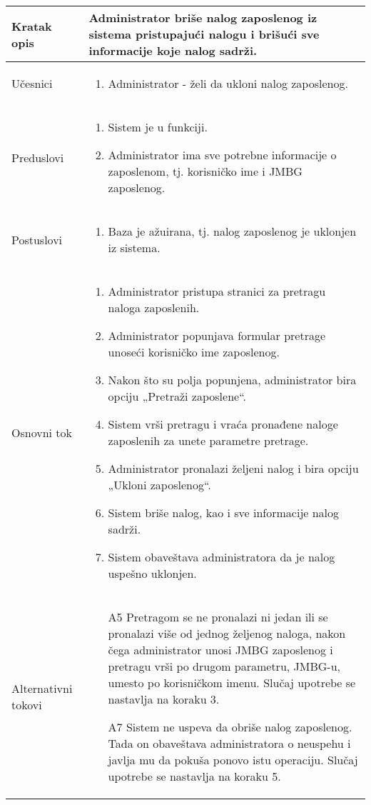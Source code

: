 \documentclass[../main.tex]{subfiles}
\begin{document}
\begin{longtable}{| p{} | p{} |} 

\hline
    Kratak opis &  Administrator briše nalog zaposlenog iz sistema pristupajući nalogu i brišući sve informacije koje nalog sadrži.\\ 
\hline    
    Učesnici & 
    	\begin{enumerate}
        \item Administrator - želi da ukloni nalog zaposlenog.
     \end{enumerate}\\
\hline
   Preduslovi & \begin{enumerate}
       \item Sistem je u funkciji.
       \item Administrator ima sve potrebne informacije o zaposlenom, tj. korisničko ime i JMBG zaposlenog.
   \end{enumerate}\\
\hline  
    Postuslovi & \begin{enumerate}
        \item Baza je ažuirana, tj. nalog zaposlenog je uklonjen iz sistema.
    \end{enumerate}\\
\hline
    Osnovni tok & \begin{enumerate}
        \item Administrator pristupa stranici za pretragu naloga zaposlenih.
        \item Administrator popunjava formular pretrage unoseći korisničko ime zaposlenog.
        \item Nakon što su polja popunjena, administrator bira opciju „Pretraži zaposlene“.
        \item Sistem vrši pretragu i vraća pronađene naloge zaposlenih za unete parametre pretrage.
        \item Administrator pronalazi željeni nalog i bira opciju „Ukloni zaposlenog“.
        \item Sistem briše nalog, kao i sve informacije nalog sadrži.
        \item Sistem obaveštava administratora da je nalog uspešno uklonjen.
    \end{enumerate}\\
\hline
    Alternativni tokovi & \begin{itemize}
        \item[A5]  Pretragom se ne pronalazi ni jedan ili se pronalazi više od jednog željenog naloga, nakon čega administrator unosi JMBG zaposlenog i pretragu vrši po drugom parametru, JMBG-u, umesto po korisničkom imenu. Slučaj upotrebe se nastavlja na koraku 3.
        \item[A7]  Sistem ne uspeva da obriše nalog zaposlenog. Tada on obaveštava administratora o neuspehu i javlja mu da pokuša ponovo istu operaciju. Slučaj upotrebe se nastavlja na koraku 5.


\end{itemize}
\end{longtable}
\end{document}

